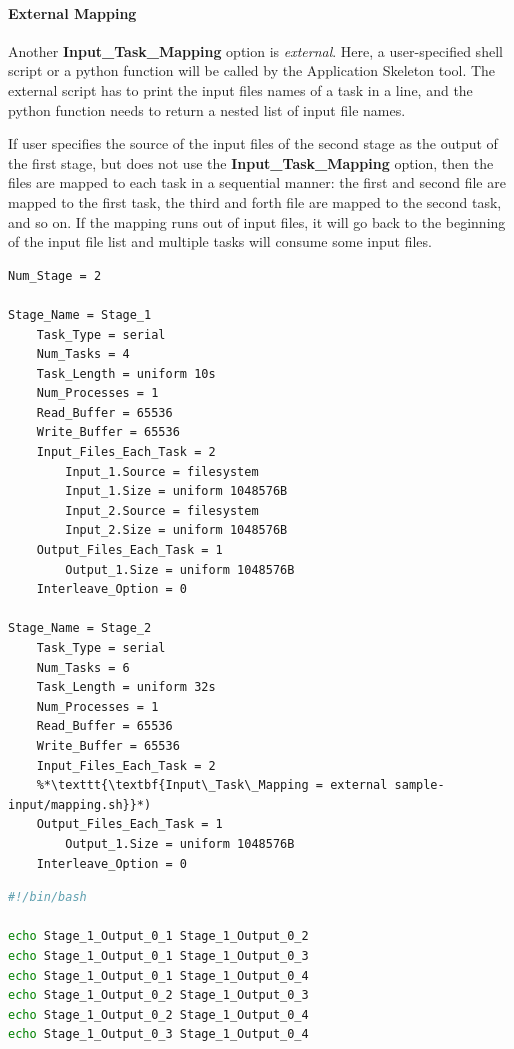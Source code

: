 \documentclass[10pt,a4paper]{article}
\begin{document}
\begin{enumerate}
\paragraph{External Mapping}
Another \textbf{Input\_Task\_Mapping} option is {\it external}. Here, a user-specified
shell script or a python function will be called by the Application Skeleton tool. The external script
has to print the input files names of a task in a line, and the python function needs to return a nested
list of input file names.

If user specifies the source of the input files of the second stage as the output of the first stage,
but does not use the \textbf{Input\_Task\_Mapping} option, then the files are mapped to each task in a sequential
manner: the first and second file are mapped to the first task, the third and forth file are mapped
to the second task, and so on. If the mapping runs out of input files, it will go back to the beginning
of the input file list and multiple tasks will consume some input files.

\end{enumerate}

\begin{lstlisting}[caption=Use case for external mapper, label=lst:exmapper, linewidth=1.0\textwidth, xleftmargin=2.5ex]
Num_Stage = 2

Stage_Name = Stage_1
    Task_Type = serial
    Num_Tasks = 4
    Task_Length = uniform 10s
    Num_Processes = 1
    Read_Buffer = 65536
    Write_Buffer = 65536
    Input_Files_Each_Task = 2
        Input_1.Source = filesystem
        Input_1.Size = uniform 1048576B
        Input_2.Source = filesystem
        Input_2.Size = uniform 1048576B
    Output_Files_Each_Task = 1
        Output_1.Size = uniform 1048576B
    Interleave_Option = 0

Stage_Name = Stage_2
    Task_Type = serial
    Num_Tasks = 6
    Task_Length = uniform 32s
    Num_Processes = 1
    Read_Buffer = 65536
    Write_Buffer = 65536
    Input_Files_Each_Task = 2
    %*\texttt{\textbf{Input\_Task\_Mapping = external sample-input/mapping.sh}}*)
    Output_Files_Each_Task = 1
        Output_1.Size = uniform 1048576B
    Interleave_Option = 0

\end{lstlisting}

\begin{lstlisting}[language=Bash, caption=Sample code for an external mapper, label=lst:excode, linewidth=1.0\textwidth, xleftmargin=2.5ex]
#!/bin/bash

echo Stage_1_Output_0_1 Stage_1_Output_0_2
echo Stage_1_Output_0_1 Stage_1_Output_0_3
echo Stage_1_Output_0_1 Stage_1_Output_0_4
echo Stage_1_Output_0_2 Stage_1_Output_0_3
echo Stage_1_Output_0_2 Stage_1_Output_0_4
echo Stage_1_Output_0_3 Stage_1_Output_0_4
\end{lstlisting}
\end{document}
